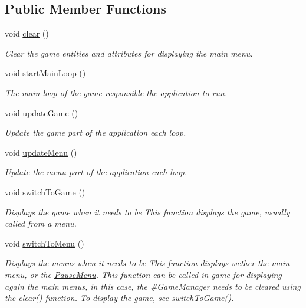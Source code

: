 \subsection*{Public Member Functions}
\begin{DoxyCompactItemize}
\item 
void \hyperlink{class_symp_1_1_game_manager_a997c17dcac4e9454a9ed7e14f0dd4ca9}{clear} ()
\begin{DoxyCompactList}\small\item\em Clear the game entities and attributes for displaying the main menu. \end{DoxyCompactList}\item 
void \hyperlink{class_symp_1_1_game_manager_a966aa77267116aa3d7056b5e48278e17}{start\-Main\-Loop} ()
\begin{DoxyCompactList}\small\item\em The main loop of the game responsible the application to run. \end{DoxyCompactList}\item 
void \hyperlink{class_symp_1_1_game_manager_a3036c6f74cf03eed27cef74e93ff502b}{update\-Game} ()
\begin{DoxyCompactList}\small\item\em Update the game part of the application each loop. \end{DoxyCompactList}\item 
void \hyperlink{class_symp_1_1_game_manager_a53eae391ee3ea958e26d60b51516c770}{update\-Menu} ()
\begin{DoxyCompactList}\small\item\em Update the menu part of the application each loop. \end{DoxyCompactList}\item 
void \hyperlink{class_symp_1_1_game_manager_a6bde65ad61b89c3d86ecfc53e0b89dfd}{switch\-To\-Game} ()
\begin{DoxyCompactList}\small\item\em Displays the game when it needs to be This function displays the game, usually called from a menu. \end{DoxyCompactList}\item 
void \hyperlink{class_symp_1_1_game_manager_a7232828cd96d0c7fe947406f73426a9e}{switch\-To\-Menu} ()
\begin{DoxyCompactList}\small\item\em Displays the menus when it needs to be This function displays wether the main menu, or the \hyperlink{class_symp_1_1_pause_menu}{Pause\-Menu}. This function can be called in game for displaying again the main menus, in this case, the \#\-Game\-Manager needs to be cleared using the \hyperlink{class_symp_1_1_game_manager_a997c17dcac4e9454a9ed7e14f0dd4ca9}{clear()} function. To display the game, see \hyperlink{class_symp_1_1_game_manager_a6bde65ad61b89c3d86ecfc53e0b89dfd}{switch\-To\-Game()}. \end{DoxyCompactList}\item 

\end{DoxyCompactItemize}
